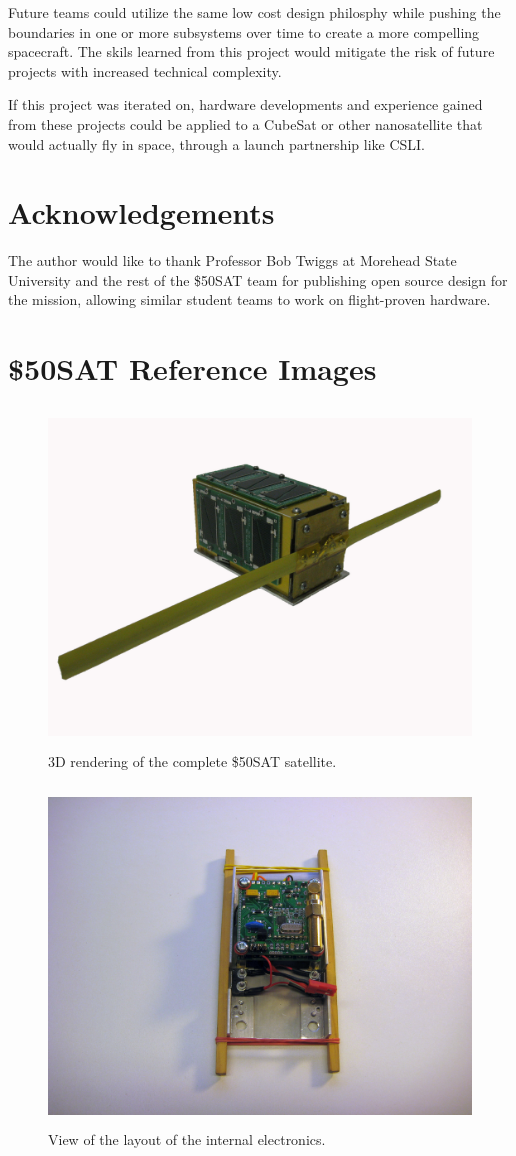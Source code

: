 \documentclass[conference]{IEEEtran} %
\begin{document}
Future teams could utilize the same low cost design philosphy while pushing the boundaries in one or more subsystems over time to create a more compelling spacecraft.
The skils learned from this project would mitigate the risk of future projects with increased technical complexity.

If this project was iterated on, hardware developments and experience gained from these projects could be applied to a CubeSat or other nanosatellite that would actually fly in space, through a launch partnership like CSLI.

\section*{Acknowledgements}
The author would like to thank Professor Bob Twiggs at Morehead State University and the rest of the \$50SAT team for publishing open source design for the mission, allowing similar student teams to work on flight-proven hardware.

\onecolumn
\appendices{}
\section{\$50SAT Reference Images}
\begin{figure}[h]
 \centering
 \includegraphics[width=12cm, height=9cm]{50sat_model.jpg}
 \caption{3D rendering of the complete \$50SAT satellite.}
\end{figure}

\begin{figure}[h]
 \centering
 \includegraphics[width=12cm, height=9cm]{internal_pcbs.jpg}
 \caption{View of the layout of the internal electronics.}
\end{figure}
\end{document}
